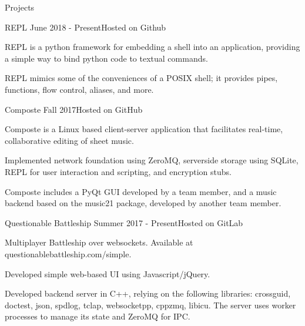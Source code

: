 \documentclass{resume} %
\begin{document}
\begin{rSection}{Projects}

\begin{rSubsection}
    {REPL}
    {June 2018 - Present}{Hosted on Github}

\item REPL is a python framework for embedding a shell into an application,
    providing a simple way to bind python code to textual commands.

\item REPL mimics some of the conveniences of a POSIX shell; it provides pipes,
    functions, flow control, aliases, and more.

\end{rSubsection}

\begin{rSubsection}
    {Composte}
    {Fall 2017}{Hosted on GitHub}

\item Composte is a Linux based client-server application that facilitates
    real-time, collaborative editing of sheet music.

\item Implemented network foundation using ZeroMQ, serverside storage using
    SQLite, REPL for user interaction and scripting, and encryption stubs.

\item Composte includes a PyQt GUI developed by a team member, and a music
    backend based on the music21 package, developed by another team member.

\end{rSubsection}

\begin{rSubsection}
    {Questionable Battleship}
    {Summer 2017 - Present}{Hosted on GitLab}

\item Multiplayer Battleship over websockets. Available at
    questionablebattleship.com/simple.

\item Developed simple web-based UI using Javascript/jQuery.

\item Developed backend server in C++, relying on the following libraries:
    crossguid, doctest, json, spdlog, tclap, websocketpp, cppzmq,
    libicu. The server uses worker processes to manage its state and ZeroMQ
    for IPC.

\end{rSubsection}


\end{rSection}
\end{document}
